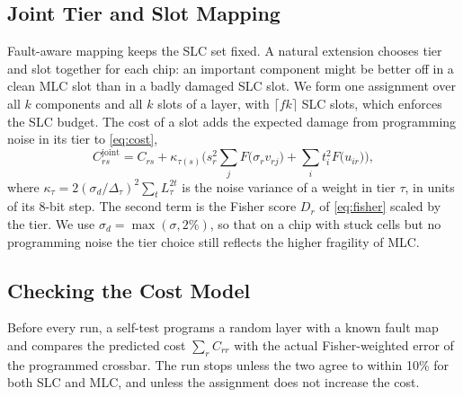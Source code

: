 \subsection{Joint Tier and Slot Mapping}
Fault-aware mapping keeps the SLC set fixed. A natural extension chooses tier and slot together for each
chip: an important component might be better off in a clean MLC slot than in a badly damaged SLC slot. We
form one assignment over all $k$ components and all $k$ slots of a layer, with $\lceil fk\rceil$ SLC slots,
which enforces the SLC budget. The cost of a slot adds the expected damage from programming noise in its
tier to \cref{eq:cost},
\begin{equation}
C^{\text{joint}}_{rs}=C_{rs}+\kappa_{\tau(s)}\Big(s_r^2\sum_j F\big(\sigma_r v_{rj}\big)+\sum_i t_i^2F\big(u_{ir}\big)\Big),
\label{eq:c1}
\end{equation}
where $\kappa_\tau=2(\sigma_d/\Delta_\tau)^2\sum_t L_\tau^{2t}$ is the noise variance of a weight in tier
$\tau$, in units of its 8-bit step. The second term is the Fisher score $D_r$ of \cref{eq:fisher} scaled
by the tier. We use $\sigma_d=\max(\sigma,2\%)$, so that on a chip with stuck cells but no programming noise
the tier choice still reflects the higher fragility of MLC.

\subsection{Checking the Cost Model}
Before every run, a self-test programs a random layer with a known fault map and compares the predicted
cost $\sum_r C_{rr}$ with the actual Fisher-weighted error of the programmed crossbar. The run stops unless
the two agree to within 10\% for both SLC and MLC, and unless the assignment does not increase the cost.
